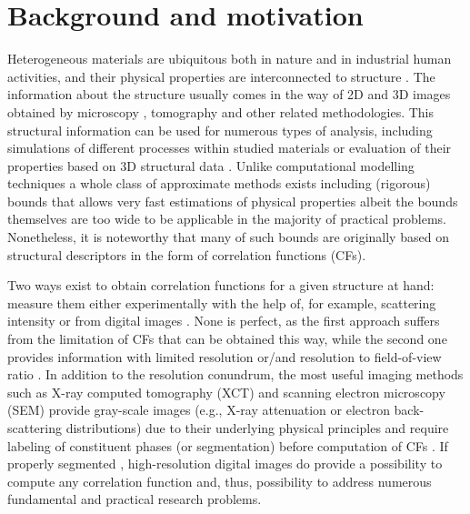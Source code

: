 \documentclass[1p]{elsarticle}
\begin{document}
\maketitle

\section{Background and motivation}
\label{sec:background}
Heterogeneous materials are ubiquitous both in nature and in industrial human
activities, and their physical properties are interconnected to structure
\cite{Torquato_book,Sahimi_book}. The information about the structure usually
comes in the way of 2D and 3D images obtained by microscopy
\cite{moussaoui2018,neumann2019,FIB-SEMpaper}, tomography \cite{xctmat_book} and
other related methodologies.  This structural information can be used for
numerous types of analysis, including simulations of different processes within
studied materials or evaluation of their properties based on 3D structural data
\cite{youssef2005,Miao2017,FDMSS}. Unlike computational modelling techniques a
whole class of approximate methods exists including (rigorous) bounds that
allows very fast estimations of physical properties
\cite{eshelby1957,berryman1986use,rozanski2023} albeit the bounds themselves are
too wide to be applicable in the majority of practical problems. Nonetheless, it
is noteworthy that many of such bounds are originally based on structural
descriptors in the form of correlation functions (CFs).

Two ways exist to obtain correlation functions for a given structure at hand:
measure them either experimentally with the help of, for example, scattering
intensity \cite{debye1957scattering,li2018direct} or from digital images
\cite{berryman1985measurement,ma2018SS}. None is perfect, as the first approach
suffers from the limitation of CFs that can be obtained this way, while the
second one provides information with limited resolution or/and resolution to
field-of-view ratio \cite{gerke2015universal}. In addition to the resolution
conundrum, the most useful imaging methods such as X-ray computed tomography
(XCT) and scanning electron microscopy (SEM) provide gray-scale images (e.g.,
X-ray attenuation or electron back-scattering distributions) due to their
underlying physical principles and require labeling of constituent phases (or
segmentation) before computation of CFs \cite{samarin2023robust}. If properly
segmented \cite{NNseg}, high-resolution digital images do provide a possibility
to compute any correlation function and, thus, possibility to address numerous
fundamental and practical research problems.
\end{document}
